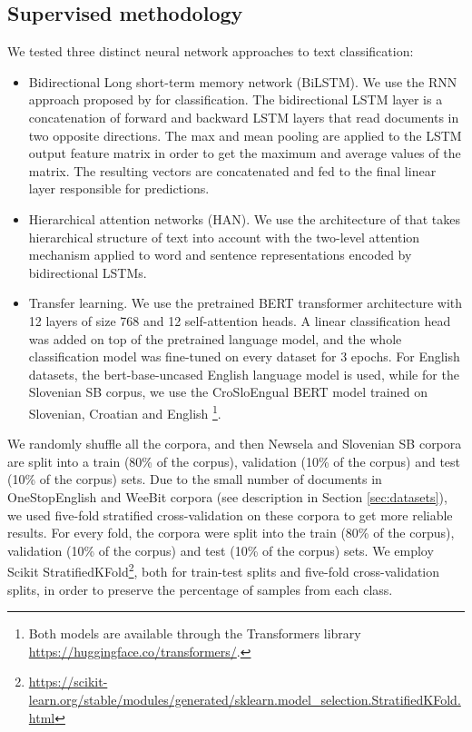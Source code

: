 \documentclass{clv3}
\begin{document}
\subsection{Supervised methodology}
\label{sec-methodology-supervised}
We tested three distinct neural network approaches to text classification:
\begin{itemize}
    \item Bidirectional Long short-term memory network (BiLSTM). We use the RNN approach proposed by \citet{conneau2017supervised} for classification. The bidirectional LSTM layer is a concatenation of forward and backward LSTM layers that read documents in two opposite directions. The max and mean pooling are applied to the LSTM output feature matrix in order to get the maximum and average values of the matrix. The resulting vectors are concatenated and fed to the final linear layer responsible for predictions.
    \item Hierarchical attention networks (HAN). We use the architecture of \citet{yang2016hierarchical} that takes hierarchical structure of text into account with the two-level attention mechanism \citep{bahdanau2014neural, xu2015show} applied to word and sentence representations encoded by bidirectional LSTMs.
    \item Transfer learning. We use the pretrained BERT transformer architecture with 12 layers of size 768 and 12 self-attention heads. A linear classification head was added on top of the pretrained language model, and the whole classification model was fine-tuned on every dataset for 3 epochs. For English datasets, the bert-base-uncased English language model is used, while for the Slovenian SB corpus, we use the CroSloEngual BERT model trained on Slovenian, Croatian and English \citep{ulcar2020xlbert}\footnote{Both models are available through the Transformers library \url{https://huggingface.co/transformers/}.}. 
    
\end{itemize}

We randomly shuffle all the corpora, and then Newsela and Slovenian SB corpora are split into a train (80\% of the corpus), validation (10\% of the corpus) and test (10\% of the corpus) sets. Due to the small number of documents in OneStopEnglish and WeeBit corpora (see description in Section \ref{sec:datasets}), we used five-fold stratified cross-validation on these corpora to get more reliable results. For every fold, the corpora were split into the train (80\% of the corpus), validation (10\% of the corpus) and test (10\% of the corpus) sets. We employ Scikit StratifiedKFold\footnote{\url{https://scikit-learn.org/stable/modules/generated/sklearn.model_selection.StratifiedKFold.html}}, both for train-test splits and five-fold cross-validation splits, in order to preserve the percentage of samples from each class.
\end{document}
